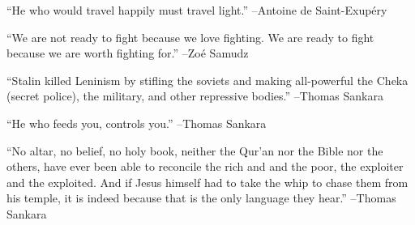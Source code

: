 \documentclass{article}%
\begin{document}
\linebreak%
\vspace{1mm}%
\begin{minipage}{\textwidth}%
\flushleft%
“He who would travel happily must travel light.”%
\linebreak%
\vspace{1mm}%
–Antoine de Saint{-}Exupéry%
\linebreak%
\vspace{1mm}%
\end{minipage}%
\linebreak%
\vspace{1mm}%
\begin{minipage}{\textwidth}%
\flushleft%
“We are not ready to fight because we love fighting. We are ready to fight because we are worth fighting for.”%
\linebreak%
\vspace{1mm}%
–Zoé Samudz%
\linebreak%
\vspace{1mm}%
\end{minipage}%
\linebreak%
\vspace{1mm}%
\begin{minipage}{\textwidth}%
\flushleft%
“Stalin killed Leninism by stifling the soviets and making all{-}powerful the Cheka (secret police), the military, and other repressive bodies.”%
\linebreak%
\vspace{1mm}%
–Thomas Sankara%
\linebreak%
\vspace{1mm}%
\end{minipage}%
\linebreak%
\vspace{1mm}%
\begin{minipage}{\textwidth}%
\flushleft%
“He who feeds you, controls you.”%
\linebreak%
\vspace{1mm}%
–Thomas Sankara%
\linebreak%
\vspace{1mm}%
\end{minipage}%
\linebreak%
\vspace{1mm}%
\begin{minipage}{\textwidth}%
\flushleft%
“No altar, no belief, no holy book, neither the Qur’an nor the Bible nor the others, have ever been able to reconcile the rich and and the poor, the exploiter and the exploited. And if Jesus himself had to take the whip to chase them from his temple, it is indeed because that is the only language they hear.”%
\linebreak%
\vspace{1mm}%
–Thomas Sankara%
\linebreak%
\vspace{1mm}%
\end{minipage}%
\end{document}

